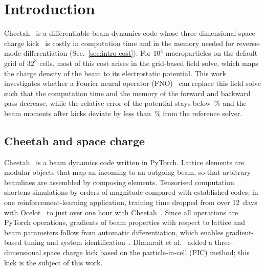 \section{Introduction}
\label{sec:intro}

Cheetah~\cite{kaiser2024cheetah} is a differentiable beam dynamics code
whose three-dimensional space charge kick~\cite{dhamrait2026memory} is
costly in computation time and in the memory needed for reverse-mode
differentiation (Sec.~\ref{sec:intro-cost}). For $10^4$ macroparticles on
the default grid of $32^3$ cells, most of this cost arises in the
grid-based field solve, which maps the charge density of the beam to its
electrostatic potential. This work investigates whether a Fourier neural
operator (FNO)~\cite{li2021fno} can replace this field solve such that the
computation time and the memory of the forward and backward pass decrease,
while the relative error of the potential stays below \,\% and the
beam moments after  kicks deviate by less than \,\% from
the reference solver.


\subsection{Cheetah and space charge}
\label{sec:intro-cheetah}

Cheetah~\cite{kaiser2024cheetah} is a beam dynamics code written in
PyTorch. Lattice elements are modular objects that map an incoming to an
outgoing beam, so that arbitrary beamlines are assembled by composing
elements. Tensorised computation shortens simulations by orders of
magnitude compared with established codes; in one reinforcement-learning
application, training time dropped from over 12~days with
Ocelot~\cite{agapov2014ocelot} to just over one hour with
Cheetah~\cite{kaiser2024cheetah}. Since all operations are PyTorch
operations, gradients of beam properties with respect to lattice and beam
parameters follow from automatic differentiation, which enables
gradient-based tuning and system identification~\cite{kaiser2024cheetah}.
Dhamrait et al.~\cite{dhamrait2026memory} added a three-dimensional space
charge kick based on the particle-in-cell (PIC) method; this kick is the
subject of this work.

